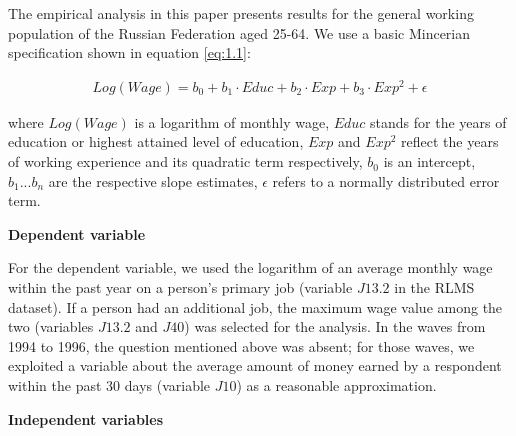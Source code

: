 \documentclass[alpha-refs]{wiley-article-01g}
\begin{document}
The empirical analysis in this paper presents results for the general working population of the Russian Federation aged 25-64. We use a basic Mincerian specification shown in equation \eqref{eq:1.1}: 


\begin{align*}\label{eq:1.1} 
Log(Wage) = b_0 + b_1\cdot Educ + b_2\cdot Exp + b_3\cdot Exp^2 + \epsilon
\end{align*}


\noindent
where $Log(Wage)$ is a logarithm of monthly wage, $Educ$ stands for the years of education or highest attained level of education, $Exp$ and $Exp^2$ reflect the years of working experience and its quadratic term respectively, $b_0$ is an intercept, $b_1 ... b_n$ are the respective slope estimates, $\epsilon$ refers to a normally distributed error term.


\textbf{Dependent variable}

For the dependent variable, we used the logarithm of an average monthly wage within the past year on a person's primary job (variable $J13.2$ in the RLMS dataset). If a person had an additional job, the maximum wage value among the two (variables $J13.2$ and $J40$) was selected for the analysis. In the waves from 1994 to 1996, the question mentioned above was absent; for those waves, we exploited a variable about the average amount of money earned by a respondent within the past 30 days (variable $J10$) as a reasonable approximation.

\textbf{Independent variables}
\end{document}
